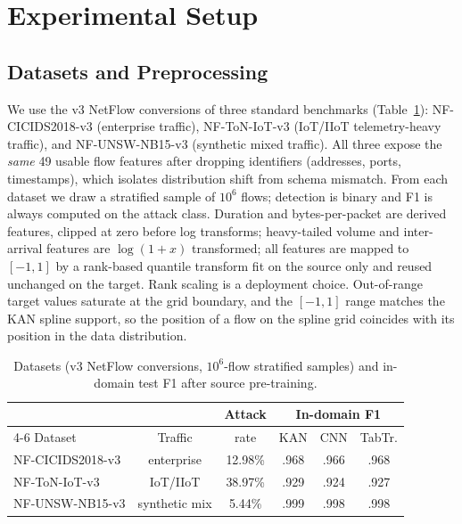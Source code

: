 \documentclass[10pt, conference, letterpaper]{IEEEtran}
\begin{document}
\section{Experimental Setup}\label{sec:setup}

\subsection{Datasets and Preprocessing}
We use the v3 NetFlow conversions \cite{sarhan2022netflow} of three
standard benchmarks (Table~\ref{tab:data}): NF-CICIDS2018-v3
\cite{sharafaldin2018cicids} (enterprise traffic), NF-ToN-IoT-v3
\cite{moustafa2021toniot} (IoT/IIoT telemetry-heavy traffic), and
NF-UNSW-NB15-v3 \cite{moustafa2015unsw} (synthetic mixed traffic). All
three expose the \emph{same} 49 usable flow features after dropping
identifiers (addresses, ports, timestamps), which isolates distribution
shift from schema mismatch. From each dataset we draw a stratified
sample of $10^6$ flows; detection is binary and F1 is always computed on
the attack class. Duration and bytes-per-packet are derived features,
clipped at zero before log transforms; heavy-tailed volume and
inter-arrival features are $\log(1+x)$ transformed; all features are
mapped to $[-1,1]$ by a rank-based quantile transform fit on the
source only and reused unchanged on the target. Rank scaling is a
deployment choice. Out-of-range target values saturate at the grid
boundary, and the $[-1,1]$ range matches the KAN spline support, so the
position of a flow on the spline grid coincides with its position in
the data distribution.

\begin{table}[t]
\caption{Datasets (v3 NetFlow conversions, $10^6$-flow stratified samples)
and in-domain test F1 after source pre-training.}
\label{tab:data}
\centering
\begin{tabular}{lccccc}
\toprule
 & & Attack & \multicolumn{3}{c}{In-domain F1} \\
\cmidrule(lr){4-6}
Dataset & Traffic & rate & KAN & CNN & TabTr. \\
\midrule
NF-CICIDS2018-v3 & enterprise & 12.98\% & .968 & .966 & .968 \\
NF-ToN-IoT-v3 & IoT/IIoT & 38.97\% & .929 & .924 & .927 \\
NF-UNSW-NB15-v3 & synthetic mix & 5.44\% & .999 & .998 & .998 \\
\bottomrule
\end{tabular}
\end{table}
\end{document}
